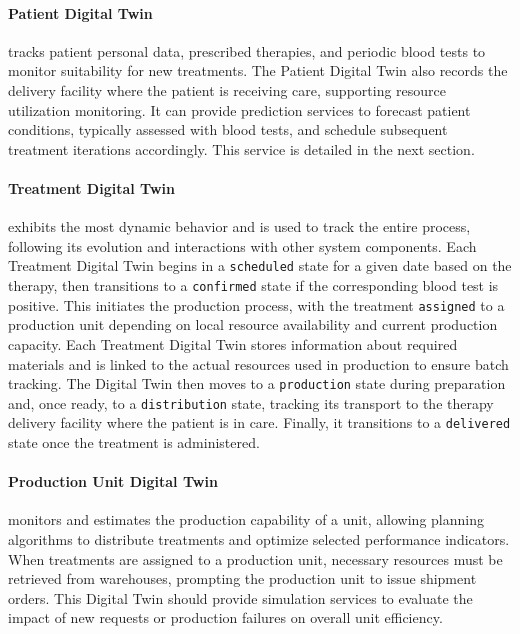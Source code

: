 \paragraph{Patient Digital Twin} tracks patient personal data, prescribed therapies, and periodic blood tests to monitor suitability for new treatments.
%
The Patient Digital Twin also records the delivery facility where the patient is receiving care, supporting resource utilization monitoring.
%
It can provide prediction services to forecast patient conditions, typically assessed with blood tests, and schedule subsequent treatment iterations accordingly. 
%
This service is detailed in the next section.

\paragraph{Treatment Digital Twin} exhibits the most dynamic behavior and is used to track the entire process, following its evolution and interactions with other system components.
%
Each Treatment Digital Twin begins in a \texttt{scheduled} state for a given date based on the therapy, then transitions to a \texttt{confirmed} state if the corresponding blood test is positive. 
%
This initiates the production process, with the treatment \texttt{assigned} to a production unit depending on local resource availability and current production capacity. 
%
Each Treatment Digital Twin stores information about required materials and is linked to the actual resources used in production to ensure batch tracking.
%
The Digital Twin then moves to a \texttt{production} state during preparation and, once ready, to a \texttt{distribution} state, tracking its transport to the therapy delivery facility where the patient is in care. 
%
Finally, it transitions to a \texttt{delivered} state once the treatment is administered.

\paragraph{Production Unit Digital Twin} monitors and estimates the production capability of a unit, allowing planning algorithms to distribute treatments and optimize selected performance indicators.
%
When treatments are assigned to a production unit, necessary resources must be retrieved from warehouses, prompting the production unit to issue shipment orders. 
%
This Digital Twin should provide simulation services to evaluate the impact of new requests or production failures on overall unit efficiency.


